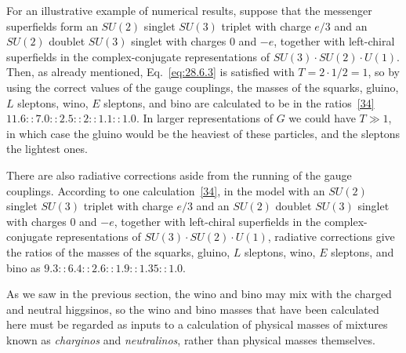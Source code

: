 For an illustrative example of numerical results, suppose that the
messenger superfields form an \(SU(2)\) singlet \(SU(3)\) triplet with
charge \(e/3\) and an \(SU(2)\) doublet \(SU(3)\) singlet with charges 0
and \(-e\), together with left-chiral superfields in the complex-conjugate
representations of \(SU(3)\mathbin{\cdot}SU(2)\mathbin{\cdot}U(1)\).
Then, as already mentioned, Eq.~\eqref{eq:28.6.3} is satisfied with
\(T=2\mathbin{\cdot}1/2=1\), so by using the correct values of the gauge
couplings, the masses of the squarks, gluino, \(L\) sleptons, wino,
\(E\) sleptons, and bino are calculated to be in the
ratios~\hyperref[ch28-ref-34]{[34]}
\(11.6::7.0::2.5::2::1.1::1.0\). In larger representations of \(G\) we
could have \(T\gg1\), in which case the gluino would be the heaviest of
these particles, and the sleptons the lightest ones.

There are also radiative corrections aside from the running of the gauge
couplings. According to one calculation~\hyperref[ch28-ref-34]{[34]}, in
the model with an \(SU(2)\) singlet \(SU(3)\) triplet with charge \(e/3\)
and an \(SU(2)\) doublet \(SU(3)\) singlet with charges 0 and \(-e\),
together with left-chiral superfields in the complex-conjugate
representations of \(SU(3)\mathbin{\cdot}SU(2)\mathbin{\cdot}U(1)\),
radiative corrections give the ratios of the masses of the squarks,
gluino, \(L\) sleptons, wino, \(E\) sleptons, and bino as
\(9.3::6.4::2.6::1.9::1.35::1.0\).

As we saw in the previous section, the wino and bino may mix with the
charged and neutral higgsinos, so the wino and bino masses that have been
calculated here must be regarded as inputs to a calculation of physical
masses of mixtures known as \emph{charginos} and \emph{neutralinos},
rather than physical masses themselves.

